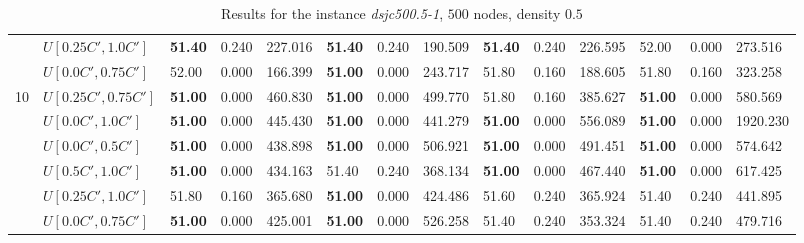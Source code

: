 \begin{table}[h]
{\begin{tabular}{|l|l||l|l|l||l|l|l||l|l|l||l|l|l|}
       & $U[0.25C',1.0C']$ & \textbf{51.40} & 0.240 & 227.016 & \textbf{51.40} & 0.240 & 190.509 & \textbf{51.40} & 0.240 & 226.595 & 52.00 & 0.000 & 273.516 \\
       & $U[0.0C',0.75C']$ & 52.00 & 0.000 & 166.399 & \textbf{51.00} & 0.000 & 243.717 & 51.80 & 0.160 & 188.605 & 51.80 & 0.160 & 323.258 \\
      \hline\hline
      \multirow{6}{*}{10}
       & $U[0.25C',0.75C']$ & \textbf{51.00} & 0.000 & 460.830 & \textbf{51.00} & 0.000 & 499.770 & 51.80 & 0.160 & 385.627 & \textbf{51.00} & 0.000 & 580.569 \\
       & $U[0.0C',1.0C']$ & \textbf{51.00} & 0.000 & 445.430 & \textbf{51.00} & 0.000 & 441.279 & \textbf{51.00} & 0.000 & 556.089 & \textbf{51.00} & 0.000 & 1920.230 \\
       & $U[0.0C',0.5C']$ & \textbf{51.00} & 0.000 & 438.898 & \textbf{51.00} & 0.000 & 506.921 & \textbf{51.00} & 0.000 & 491.451 & \textbf{51.00} & 0.000 & 574.642 \\
       & $U[0.5C',1.0C']$ & \textbf{51.00} & 0.000 & 434.163 & 51.40 & 0.240 & 368.134 & \textbf{51.00} & 0.000 & 467.440 & \textbf{51.00} & 0.000 & 617.425 \\
       & $U[0.25C',1.0C']$ & 51.80 & 0.160 & 365.680 & \textbf{51.00} & 0.000 & 424.486 & 51.60 & 0.240 & 365.924 & 51.40 & 0.240 & 441.895 \\
       & $U[0.0C',0.75C']$ & \textbf{51.00} & 0.000 & 425.001 & \textbf{51.00} & 0.000 & 526.258 & 51.40 & 0.240 & 353.324 & 51.40 & 0.240 & 479.716 \\
      \hline
      \end{tabular}
      }
      \caption{Results for the instance \textit{dsjc500.5-1}, $500$ nodes, density $0.5$}
      \label{tab:in1}\end{table}


